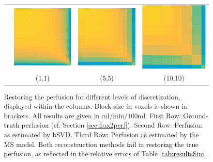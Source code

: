 \documentclass[paper=a4, fontsize=11pt,parskip=half,headings=small]{scrartcl}
\begin{document}
\begin{figure}[H]
\begin{tabular}{c c c c}
			 \rbox{8ex}{MS} & \includegraphics[width = .25\textwidth]{./figs/recMS-PDE-1.eps} & \includegraphics[width = .25\textwidth]{./figs/recMS-PDE-5.eps} & \includegraphics[width = .25\textwidth]{./figs/recMS-PDE-10.eps}\\			 			 			  
			   & (1,1) & (5,5) & (10,10)
		\end{tabular}
		\caption{Restoring the perfusion for different levels of discretization, displayed within the columns. Block size in voxels is shown in brackets. All results are given in $\mathrm{ml/min/100ml}$. First Row: Ground-truth perfusion (cf. Section \ref{sec:flux2perf}). Second Row: Perfusion as estimated by bSVD. Third Row: Perfusion as estimated by the MS model. Both reconstruction methods fail in restoring the true perfusion, as reflected in the relative errors of Table \ref{tab:resultsSim}.}	
		\label{fig:resultsPMM}			
	\end{figure}
\end{document}
